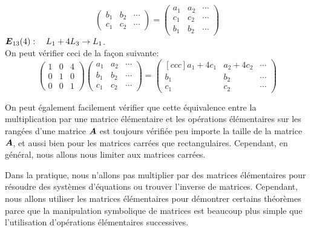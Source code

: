 \begin{exemple}
\[\begin{pmatrix}
b_1 & b_2 & \cdots \\
c_1 & c_2 & \cdots
\end{pmatrix} = 
\begin{pmatrix}
a_1 & a_2 & \cdots \\
c_1 & c_2 & \cdots \\
b_1 & b_2 & \cdots
\end{pmatrix}
\]
 $\boldsymbol{E}_{13}(4):\quad L_1 + 4L_3 \rightarrow L_1$.\\
 On peut vérifier ceci de la façon suivante:
\[
\begin{pmatrix}
1 & 0 & 4 \\
0 & 1 & 0 \\
0 & 0 & 1
\end{pmatrix}
\begin{pmatrix}
a_1 & a_2 & \cdots \\
b_1 & b_2 & \cdots \\
c_1 & c_2 & \cdots
\end{pmatrix} = 
\begin{pmatrix}[ccc]
a_1 + 4c_1 & a_2 + 4c_2 & \cdots \\
b_1 & b_2 & \cdots \\
c_1 & c_2 & \cdots
\end{pmatrix}
\]
\end{exemple}

On peut également facilement vérifier que cette équivalence entre la multiplication 
par une matrice élémentaire et les opérations élémentaires sur les rangées d'une matrice $\boldsymbol{A}$ est
toujours vérifiée peu importe la taille de la matrice $\boldsymbol{A}$, et aussi bien pour les matrices carrées que rectangulaires. Cependant, en général, nous allons nous limiter aux matrices carrées.

Dans la pratique, nous n'allons pas multiplier par des matrices élémentaires pour résoudre des systèmes d'équations ou trouver l'inverse de matrices.  Cependant, nous allons utiliser
les matrices élémentaires pour démontrer certains théorèmes parce que la manipulation symbolique de matrices est beaucoup plus simple que l'utilisation d'opérations élémentaires successives.


